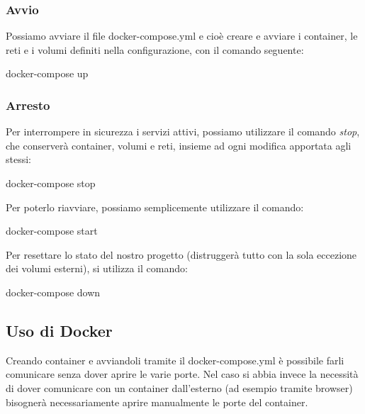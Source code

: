 \subsubsection{Avvio}
Possiamo avviare il file docker-compose.yml e cioè creare e avviare i container, le reti e i volumi definiti nella configurazione, con il comando seguente:
\begin{pythoncode}
docker-compose up
\end{pythoncode}

\subsubsection{Arresto}
Per interrompere in sicurezza i servizi attivi, possiamo utilizzare il comando \textit{stop}, che conserverà container, volumi e reti, insieme ad ogni modifica apportata agli stessi:
\begin{pythoncode}
docker-compose stop
\end{pythoncode}
Per poterlo riavviare, possiamo semplicemente utilizzare il comando:
\begin{pythoncode}
docker-compose start
\end{pythoncode}
Per resettare lo stato del nostro progetto (distruggerà tutto con la sola eccezione dei volumi esterni), si utilizza il comando:
\begin{pythoncode}
docker-compose down
\end{pythoncode}
\cite{docker-compose}

\subsection{Uso di Docker}
Creando container e avviandoli tramite il docker-compose.yml è possibile farli comunicare senza dover aprire le varie porte. Nel caso si abbia invece la necessità di dover comunicare con un container dall'esterno (ad esempio tramite browser) bisognerà necessariamente aprire manualmente le porte del container.
